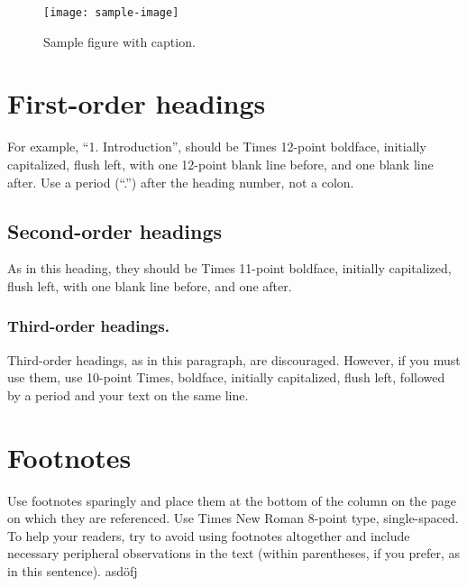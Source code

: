 \documentclass[10pt]{article}
\begin{document}
\begin{figure}[thb]
    \centering
    \texttt{[image: sample-image]}
    \caption{Sample figure with caption.}
    \label{fig: sample-figure}       %
\end{figure}

\section{First-order headings}

For example, “1. Introduction”, should be Times 12-point boldface, initially capitalized, flush left, with one 12-point blank line before, and one blank line after. Use a period (“.”) after the heading number, not a colon.

\subsection{Second-order headings}

As in this heading, they should be Times 11-point boldface, initially capitalized, flush left, with one blank line before, and one after.

\subsubsection{Third-order headings. }

Third-order headings, as in this paragraph, are discouraged. However, if you must use them, use 10-point Times, boldface, initially capitalized, flush left, followed by a period and your text on the same line.

\section{Footnotes}

Use footnotes sparingly and place them at the bottom of the column on the page on which they are referenced. Use Times New Roman 8-point type, single-spaced. To help your readers, try to avoid using footnotes altogether and include necessary peripheral observations in the text (within parentheses, if you prefer, as in this sentence).
asdöfj
\end{document}
